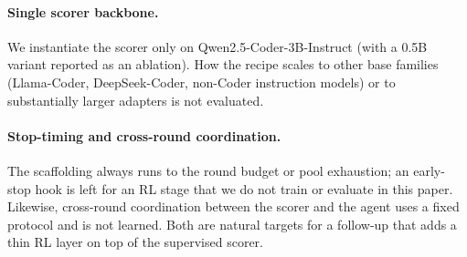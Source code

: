 \paragraph{Single scorer backbone.}
We instantiate the scorer only on Qwen2.5-Coder-3B-Instruct
(with a 0.5B variant reported as an ablation). How the recipe
scales to other base families (Llama-Coder, DeepSeek-Coder,
non-Coder instruction models) or to substantially larger
adapters is not evaluated.

\paragraph{Stop-timing and cross-round coordination.}
The scaffolding always runs to the round budget or pool
exhaustion; an early-stop hook is left for an RL stage that we
do not train or evaluate in this paper. Likewise, cross-round
coordination between the scorer and the agent uses a fixed
protocol and is not learned. Both are natural targets for a
follow-up that adds a thin RL layer on top of the supervised
scorer.
